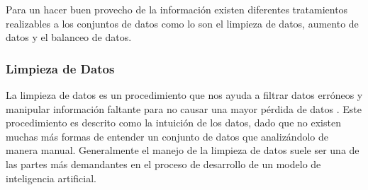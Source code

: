 \documentclass[letter,12pt]{report}
\begin{document}
Para un hacer buen provecho de la información existen diferentes tratamientos realizables
a los conjuntos de datos como lo son el limpieza de datos, aumento de datos y el balanceo
de datos.

\subsubsection{Limpieza de Datos}
La limpieza de datos es un procedimiento que nos ayuda a filtrar datos erróneos y
manipular información faltante para no causar una mayor pérdida de datos \cite{Clean}.
Este procedimiento es descrito como la intuición de los datos, dado que no existen muchas
más formas de entender un conjunto de datos que analizándolo de manera manual.
Generalmente el manejo de la limpieza de datos suele ser una de las partes más
demandantes en el proceso de desarrollo de un modelo de inteligencia artificial.
\end{document}
